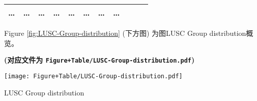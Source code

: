 \documentclass[
]{article}
\begin{document}
\begin{longtable}[]{@{}lllllllllll@{}}
\begin{minipage}[t]{0.07\columnwidth}
\ldots{}\strut
\end{minipage} & \begin{minipage}[t]{0.07\columnwidth}\raggedright
\ldots{}\strut
\end{minipage} & \begin{minipage}[t]{0.07\columnwidth}\raggedright
\ldots{}\strut
\end{minipage} & \begin{minipage}[t]{0.07\columnwidth}\raggedright
\ldots{}\strut
\end{minipage} & \begin{minipage}[t]{0.07\columnwidth}\raggedright
\ldots{}\strut
\end{minipage} & \begin{minipage}[t]{0.09\columnwidth}\raggedright
\ldots{}\strut
\end{minipage} & \begin{minipage}[t]{0.10\columnwidth}\raggedright
\ldots{}\strut
\end{minipage} & \begin{minipage}[t]{0.03\columnwidth}\raggedright
\ldots{}\strut
\end{minipage}\tabularnewline
\bottomrule
\end{longtable}

\begin{center}\vspace{1.5cm}\end{center}

\begin{center}\vspace{1.5cm}\end{center}

Figure \ref{fig:LUSC-Group-distribution} (下方图) 为图LUSC Group distribution概览。

\textbf{(对应文件为 \texttt{Figure+Table/LUSC-Group-distribution.pdf})}

\def\@captype{figure}
\begin{center}
\texttt{[image: Figure+Table/LUSC-Group-distribution.pdf]}
\caption{LUSC Group distribution}\label{fig:LUSC-Group-distribution}
\end{center}

\begin{center}\vspace{1.5cm}\end{center}
\end{document}
